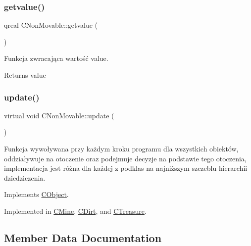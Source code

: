 \subsubsection{\texorpdfstring{getvalue()}{getvalue()}}
{\footnotesize\ttfamily qreal C\+Non\+Movable\+::getvalue (\begin{DoxyParamCaption}{ }\end{DoxyParamCaption})}



Funkcja zwracająca wartość value. 

\begin{DoxyReturn}{Returns}
value 
\end{DoxyReturn}
\mbox{\label{class_c_non_movable_ace03bea0246940c6c5c0b26ffa1ef165}} 
\subsubsection{\texorpdfstring{update()}{update()}}
{\footnotesize\ttfamily virtual void C\+Non\+Movable\+::update (\begin{DoxyParamCaption}{ }\end{DoxyParamCaption})\hspace{0.3cm}{\ttfamily [pure virtual]}}



Funkcja wywoływana przy każdym kroku programu dla wszystkich obiektów, oddziaływuje na otoczenie oraz podejmuje decyzje na podstawie tego otoczenia, implementacja jest różna dla każdej z podklas na najniższym szczeblu hierarchii dziedziczenia. 



Implements \mbox{\hyperlink{class_c_object_acb42ca516e836d0267ddb9a0556916a9}{C\+Object}}.



Implemented in \mbox{\hyperlink{class_c_mine_aef4825eff1e61d284d3da7a2d630acb5}{C\+Mine}}, \mbox{\hyperlink{class_c_dirt_a0f077e7fde1b397f08659f65d28cf573}{C\+Dirt}}, and \mbox{\hyperlink{class_c_treasure_a5030f2a7279aa608c40741f9e7040a90}{C\+Treasure}}.



\subsection{Member Data Documentation}
\mbox{\label{class_c_non_movable_aaa6f737556a51a132b8cc89255b8c096}} 
